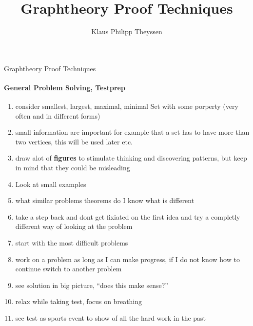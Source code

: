 \documentclass[a4paper]{article}
\title{Graphtheory Proof Techniques}
\author{Klaus Philipp Theyssen}
\begin{document}
\begin{center}
    \Large Graphtheory Proof Techniques
\end{center}


\paragraph{General Problem Solving, Testprep}
\begin{enumerate}
    \item consider smallest, largest, maximal, minimal Set with some 
    porperty (very often and in different forms)
    \item small information are important for example that a set 
    has to have more than two vertices, this will be used later etc.
    \item draw alot of \textbf{figures} to stimulate thinking and discovering patterns,
    but keep in mind that they could be misleading
    \item Look at small examples 
    \item what similar problems theorems do I know what is different
    \item take a step back and dont get fixiated on the first idea and try 
    a completly different way of looking at the problem
    \item start with the most difficult problems
    \item work on a problem as long as I can make progress, if I do not know
    how to continue switch to another problem
    \item see solution in big picture, \enquote{does this make sense?}
    \item relax while taking test, focus on breathing 
    \item see test as sports event to show of all the hard work in the past
\end{enumerate}
\end{document}
